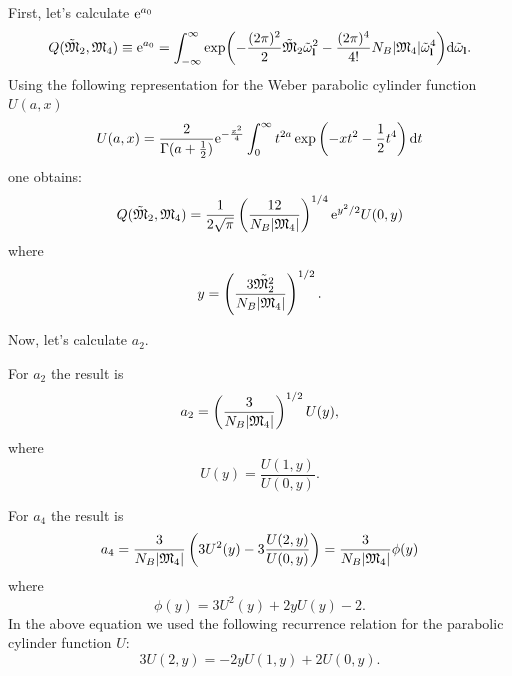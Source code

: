 First, let's calculate ${\rm e}^{a_0}$
\begin{equation}
	Q(\tilde{\mathfrak{M}}_2, \mathfrak{M}_4) \equiv {\rm e}^{a_0} = \int_{-\infty}^{\infty} 
	\exp(- \frac{(2\pi)^2}{2} \tilde{\mathfrak{M}}_2 \tilde{\omega}_{\vb l}^2 - \frac{(2\pi)^4}{4!}N_B \abs{\mathfrak{M}_4} \tilde{\omega}_{\vb l}^4) 
	{\rm d} \tilde{\omega}_{\vb l}.
\end{equation}
Using the following representation for the Weber parabolic cylinder function $U(a,x)$
\begin{equation}
	\label{parab_cylinder_t4}
	U(a,x) = \frac{2}{\Gamma(a+\frac{1}{2})}{\rm e}^{-\frac{x^2}{4}} \int_{0}^{\infty}t^{2a}\exp\left(-xt^2 - \frac{1}{2}t^4\right) {\rm d} t
\end{equation}
one obtains:
\begin{equation}
	\label{quantity_Q}
	Q(\tilde{\mathfrak{M}}_2, \mathfrak{M}_4) = \frac{1}{2\sqrt{\pi}} \left(\frac{12}{N_B \abs{\mathfrak{M}_4}}\right)^{1/4} {\rm e}^{y^2/2} U(0,y)
\end{equation}
where 
\begin{equation}
	y = \left( \frac{3 \tilde{\mathfrak{M}_2^2}}{N_B \abs{\mathfrak{M}_4}}\right)^{1/2}.
\end{equation}

Now, let's calculate $a_2$.

For $a_2$ the result is
\begin{equation}
	a_2 = \left(\frac{3}{N_B \abs{\mathfrak{M}_4}}\right)^{1/2} U(y),
\end{equation}
where 
\begin{equation}
	U(y) = \frac{U(1,y)}{U(0,y)}.
\end{equation}

For $a_4$ the result is
\begin{equation}
	a_4 = \frac{3}{N_B \abs{\mathfrak{M}_4}}\left(3U^2(y) -3 \frac{U(2,y)}{U(0,y)}\right) = 
	\frac{3}{N_B \abs{\mathfrak{M}_4}} \phi(y)
\end{equation}
where 
\begin{equation}
	\phi(y) = 3U^2(y) + 2yU(y) - 2.
\end{equation}
In the above equation we used the following recurrence relation for the parabolic cylinder function $U$:
\begin{equation}
	3U(2,y) = -2yU(1,y) + 2U(0,y).
\end{equation}

